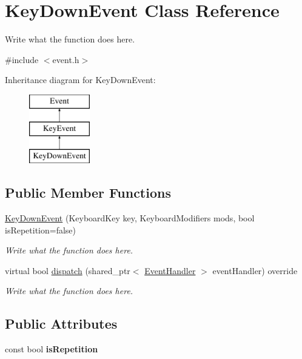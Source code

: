 \hypertarget{classKeyDownEvent}{\section{Key\+Down\+Event Class Reference}
\label{classKeyDownEvent}
}


Write what the function does here.  




{\ttfamily \#include $<$event.\+h$>$}

Inheritance diagram for Key\+Down\+Event\+:\begin{figure}[H]
\begin{center}
\leavevmode
\includegraphics[height=3.000000cm]{classKeyDownEvent}
\end{center}
\end{figure}
\subsection*{Public Member Functions}
\begin{DoxyCompactItemize}
\item 
\hyperlink{classKeyDownEvent_ae27c2dfd549d9ea2ffd270e566aece6a}{Key\+Down\+Event} (Keyboard\+Key key, Keyboard\+Modifiers mods, bool is\+Repetition=false)
\begin{DoxyCompactList}\small\item\em Write what the function does here. \end{DoxyCompactList}\item 
virtual bool \hyperlink{classKeyDownEvent_a0661aa3784232a84df40fd570b865a51}{dispatch} (shared\+\_\+ptr$<$ \hyperlink{structEventHandler}{Event\+Handler} $>$ event\+Handler) override
\begin{DoxyCompactList}\small\item\em Write what the function does here. \end{DoxyCompactList}\end{DoxyCompactItemize}
\subsection*{Public Attributes}
\begin{DoxyCompactItemize}
\item 
\hypertarget{classKeyDownEvent_aa9ad513136e6d324870e601bbea2f869}{const bool {\bfseries is\+Repetition}}\label{classKeyDownEvent_aa9ad513136e6d324870e601bbea2f869}

\end{DoxyCompactItemize}
